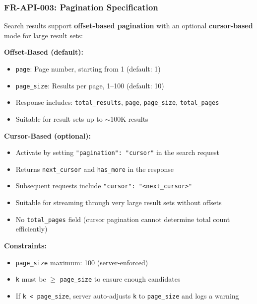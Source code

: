 \documentclass[11pt,a4paper]{article}
\newcommand{\inlinecode}[1]{\texttt{\small\colorbox{ctCodeBg}{#1}}}
\begin{document}
\subsubsection{FR-API-003: Pagination Specification}

\begin{reqbox}
Search results support \textbf{offset-based pagination} with an optional \textbf{cursor-based} mode for large result sets:

\textbf{Offset-Based (default):}
\begin{itemize}
    \item \inlinecode{page}: Page number, starting from 1 (default: 1)
    \item \inlinecode{page\_size}: Results per page, 1--100 (default: 10)
    \item Response includes: \inlinecode{total\_results}, \inlinecode{page}, \inlinecode{page\_size}, \inlinecode{total\_pages}
    \item Suitable for result sets up to $\sim$100K results
\end{itemize}

\textbf{Cursor-Based (optional):}
\begin{itemize}
    \item Activate by setting \inlinecode{"pagination": "cursor"} in the search request
    \item Returns \inlinecode{next\_cursor} and \inlinecode{has\_more} in the response
    \item Subsequent requests include \inlinecode{"cursor": "<next\_cursor>"}
    \item Suitable for streaming through very large result sets without offsets
    \item No \inlinecode{total\_pages} field (cursor pagination cannot determine total count efficiently)
\end{itemize}

\textbf{Constraints:}
\begin{itemize}
    \item \inlinecode{page\_size} maximum: 100 (server-enforced)
    \item \inlinecode{k} must be $\geq$ \inlinecode{page\_size} to ensure enough candidates
    \item If \inlinecode{k < page\_size}, server auto-adjusts \inlinecode{k} to \inlinecode{page\_size} and logs a warning
\end{itemize}
\end{reqbox}
\end{document}
